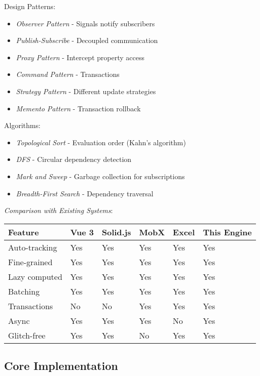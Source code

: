 \documentclass[11pt]{article}
\begin{document}
Design Patterns:

\begin{itemize}
\item \emph{Observer Pattern} - Signals notify subscribers
\item \emph{Publish-Subscribe} - Decoupled communication
\item \emph{Proxy Pattern} - Intercept property access
\item \emph{Command Pattern} - Transactions
\item \emph{Strategy Pattern} - Different update strategies
\item \emph{Memento Pattern} - Transaction rollback
\end{itemize}

Algorithms:

\begin{itemize}
\item \emph{Topological Sort} - Evaluation order (Kahn's algorithm)
\item \emph{DFS} - Circular dependency detection
\item \emph{Mark and Sweep} - Garbage collection for subscriptions
\item \emph{Breadth-First Search} - Dependency traversal
\end{itemize}

\emph{Comparison with Existing Systems}:

\begin{center}
\begin{tabular}{llllll}
Feature & Vue 3 & Solid.js & MobX & Excel & This Engine\\
\hline
Auto-tracking & Yes & Yes & Yes & Yes & Yes\\
Fine-grained & Yes & Yes & Yes & Yes & Yes\\
Lazy computed & Yes & Yes & Yes & Yes & Yes\\
Batching & Yes & Yes & Yes & Yes & Yes\\
Transactions & No & No & Yes & Yes & Yes\\
Async & Yes & Yes & Yes & No & Yes\\
Glitch-free & Yes & Yes & No & Yes & Yes\\
\end{tabular}
\end{center}
\subsection{Core Implementation}
\label{sec:orgbd4a6ba}
\end{document}
